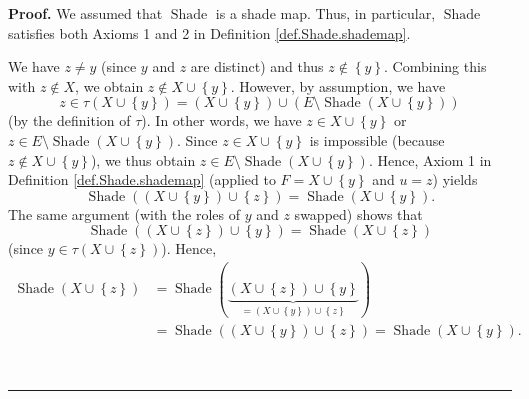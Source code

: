 \documentclass[numbers=enddot,12pt,final,onecolumn]{scrartcl}%
\theoremstyle{definition}
\newenvironment{proof}[1][Proof]{\noindent\textbf{#1.} }{\ \rule{0.5em}{0.5em}}
\newenvironment{verlong}{}{}
\begin{document}
\begin{verlong}
\begin{proof}
We assumed that $\operatorname*{Shade}$ is a shade map. Thus, in particular,
$\operatorname*{Shade}$ satisfies both Axioms 1 and 2 in Definition
\ref{def.Shade.shademap}.

We have $z\neq y$ (since $y$ and $z$ are distinct) and thus $z\notin\left\{
y\right\}  $. Combining this with $z\notin X$, we obtain $z\notin
X\cup\left\{  y\right\}  $. However, by assumption, we have%
\[
z\in\tau\left(  X\cup\left\{  y\right\}  \right)  =\left(  X\cup\left\{
y\right\}  \right)  \cup\left(  E\setminus\operatorname*{Shade}\left(
X\cup\left\{  y\right\}  \right)  \right)
\]
(by the definition of $\tau$). In other words, we have $z\in X\cup\left\{
y\right\}  $ or $z\in E\setminus\operatorname*{Shade}\left(  X\cup\left\{
y\right\}  \right)  $. Since $z\in X\cup\left\{  y\right\}  $ is impossible
(because $z\notin X\cup\left\{  y\right\}  $), we thus obtain $z\in
E\setminus\operatorname*{Shade}\left(  X\cup\left\{  y\right\}  \right)  $.
Hence, Axiom 1 in Definition \ref{def.Shade.shademap} (applied to
$F=X\cup\left\{  y\right\}  $ and $u=z$) yields%
\[
\operatorname*{Shade}\left(  \left(  X\cup\left\{  y\right\}  \right)
\cup\left\{  z\right\}  \right)  =\operatorname*{Shade}\left(  X\cup\left\{
y\right\}  \right)  .
\]
The same argument (with the roles of $y$ and $z$ swapped) shows that%
\[
\operatorname*{Shade}\left(  \left(  X\cup\left\{  z\right\}  \right)
\cup\left\{  y\right\}  \right)  =\operatorname*{Shade}\left(  X\cup\left\{
z\right\}  \right)
\]
(since $y\in\tau\left(  X\cup\left\{  z\right\}  \right)  $). Hence,%
\begin{align*}
\operatorname*{Shade}\left(  X\cup\left\{  z\right\}  \right)   &
=\operatorname*{Shade}\left(  \underbrace{\left(  X\cup\left\{  z\right\}
\right)  \cup\left\{  y\right\}  }_{=\left(  X\cup\left\{  y\right\}  \right)
\cup\left\{  z\right\}  }\right) \\
&  =\operatorname*{Shade}\left(  \left(  X\cup\left\{  y\right\}  \right)
\cup\left\{  z\right\}  \right)  =\operatorname*{Shade}\left(  X\cup\left\{
y\right\}  \right)  .
\end{align*}



\end{proof}
\end{verlong}
\end{document}
